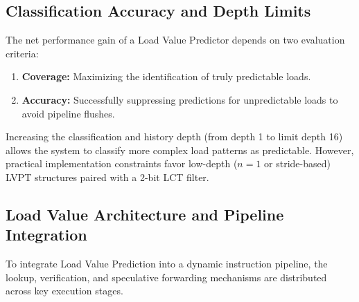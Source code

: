 \subsection{Classification Accuracy and Depth Limits}

The net performance gain of a Load Value Predictor depends on two evaluation criteria:
\begin{enumerate}
    \item \textbf{Coverage:} Maximizing the identification of truly predictable loads.
    \item \textbf{Accuracy:} Successfully suppressing predictions for unpredictable loads to avoid pipeline flushes.
\end{enumerate}

Increasing the classification and history depth (from depth 1 to limit depth 16) allows the system to classify more complex load patterns as predictable. However, practical implementation constraints favor low-depth ($n=1$ or stride-based) LVPT structures paired with a 2-bit LCT filter.

\subsection{Load Value Architecture and Pipeline Integration}
\label{subsec:load_value_architecture}

To integrate Load Value Prediction into a dynamic instruction pipeline, the lookup, verification, and speculative forwarding mechanisms are distributed across key execution stages.

